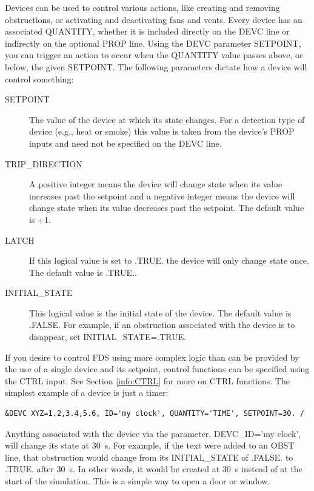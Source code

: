 \documentclass[11pt]{book}
\begin{document}
Devices can be used to control various actions, like creating and removing obstructions, or activating and deactivating
fans and vents. Every device has an associated {\ct QUANTITY}, whether it is included directly on the {\ct DEVC} line or
indirectly on the optional {\ct PROP} line. Using the {\ct DEVC} parameter {\ct SETPOINT}, you can trigger an action to
occur when the {\ct QUANTITY} value passes above, or below, the given {\ct SETPOINT}.
The following parameters dictate how a device will control something:
\begin{description}
\item[{\ct SETPOINT}] The value of the device at which its state changes.  For a detection type of device (e.g., heat or smoke) this value is taken from the device's {\ct PROP} inputs and need not be specified on the {\ct DEVC} line.
\item[{\ct TRIP\_DIRECTION}] A positive integer means the device will change state when its value increases past the setpoint and a negative integer means the device will change state when its value decreases past the setpoint.  The default value is +1.
\item[{\ct LATCH}] If this logical value is set to {\ct .TRUE.} the device will only change state once. The default value is {\ct .TRUE.}.
\item[{\ct INITIAL\_STATE}] This logical value is the initial state of the device. The default value is {\ct .FALSE.} For example, if an obstruction associated with the device is to disappear, set {\ct INITIAL\_STATE=.TRUE.}
\end{description}
If you desire to control FDS using more complex logic than can be provided
by the use of a single device and its setpoint, control functions can be specified using the {\ct CTRL} input.
See Section \ref{info:CTRL} for more on {\ct CTRL} functions.
The simplest example of a device is just a timer:
\begin{lstlisting}
&DEVC XYZ=1.2,3.4,5.6, ID='my clock', QUANTITY='TIME', SETPOINT=30. /
\end{lstlisting}
Anything associated with the device via the parameter, {\ct DEVC\_ID='my clock'}, will change its state at 30~s. For example, if the text were added to an {\ct OBST} line, that obstruction would change from its {\ct INITIAL\_STATE} of {\ct .FALSE.} to {\ct .TRUE.} after 30~s. In other words, it would be created at 30~s instead of at the start of the simulation. This is a simple way to open a door or window.
\end{document}
